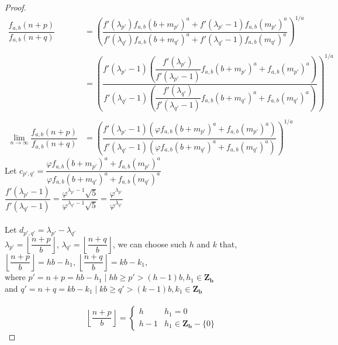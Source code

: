 \documentclass[preprint,12pt]{elsarticle}
\begin{document}
\begin{proof}
	\begin{align*}
		\dfrac{f_{a,b}(n+p)}{f_{a,b}(n+q)} &= \left(\dfrac{f'(\lambda_{p'})f_{a,b}(b+m_{p'})^a + f'(\lambda_{p'}-1)f_{a,b}(m_{p'})^a}{f'(\lambda_{q'})f_{a,b}(b+m_{q'})^a + f'(\lambda_{q'}-1)f_{a,b}(m_{q'})^a}\right)^{1/a}\\\\
		&= \left(\dfrac{f'(\lambda_{p'}-1)\left(\dfrac{f'(\lambda_{p'})}{f'(\lambda_{p'}-1)}f_{a,b}(b+m_{p'})^a + f_{a,b}(m_{p'})^a\right)}{f'(\lambda_{q'}-1)\left(\dfrac{f'(\lambda_{q'})}{f'(\lambda_{q'}-1)}f_{a,b}(b+m_{q'})^a + f_{a,b}(m_{q'})^a\right)}\right)^{1/a}\\\\
		\lim_{n \to \infty}\dfrac{f_{a,b}(n+p)}{f_{a,b}(n+q)} &=
		\left(\dfrac{f'(\lambda_{p'}-1)\left(\varphi f_{a,b}(b+m_{p'})^a + f_{a,b}(m_{p'})^a\right)}{f'(\lambda_{q'}-1)\left(\varphi f_{a,b}(b+m_{q'})^a + f_{a,b}(m_{q'})^a\right)}\right)^{1/a}
	\end{align*}
		Let $c_{p',q'} = \dfrac{\varphi f_{a,b}(b+m_{p'})^a + f_{a,b}(m_{p'})^a}{\varphi f_{a,b}(b+m_{q'})^a + f_{a,b}(m_{q'})^a}$\\
	$\dfrac{f'(\lambda_{p'} - 1)}{f'(\lambda_{q'} - 1)} = \dfrac{\varphi^{\lambda_{p'} - 1}\sqrt{5}}{\varphi^{\lambda_{q'} - 1}\sqrt{5}} = \dfrac{\varphi^{\lambda_{p'}}}{\varphi^{\lambda_{q'}}}$\\\\
	Let $d_{p', q'} = \lambda_{p'} - \lambda_{q'}$\\
	$\lambda_{p'} = \left\lfloor\dfrac{n + p}{b}\right\rfloor$, $\lambda_{q'} = \left\lfloor\dfrac{n + q}{b}\right\rfloor$, we can choose such $h$ and $k$ that,\\
	$\left\lfloor\dfrac{n + p}{b}\right\rfloor = hb - h_1$, $\left\lfloor\dfrac{n + q}{b}\right\rfloor = kb - k_1$,\\where $p'= n + p = hb - h_1 \mid hb \geq p' > (h-1)b, h_1\in\mathbf{Z_b}$\\
	and $q' = n + q = kb - k_1 \mid kb \geq q' > (k-1)b, k_1\in\mathbf{Z_b}$\\\\
	\begin{equation*}
		\left\lfloor\dfrac{n + p}{b}\right\rfloor = \begin{cases}
		h & h_1 = 0\\
		h - 1 & h_1 \in \mathbf{Z_b} - \{0\}
		\end{cases}
	\end{equation*}
	\begin{equation*}

\end{equation*}
\end{proof}
\end{document}
